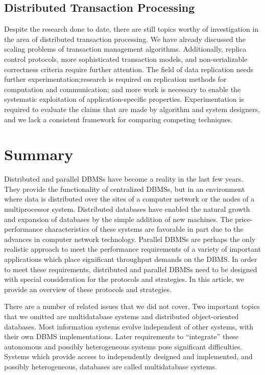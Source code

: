 \documentclass{article}
\begin{document}
\subsection{Distributed Transaction Processing}
Despite the research done to date, there are still topics worthy of investigation in the area of distributed
transaction processing. We have already discussed the scaling problems of transaction management algorithms. Additionally, replica control protocols, more sophisticated transaction models, and non-serializable correctness criteria require further attention. The field of data replication needs further experimentation;research is required on replication methods for computation and communication; and more work is necessary to enable the systematic exploitation of application-specific properties. Experimentation is required to evaluate the claims that are made by algorithm and system designers, and we lack a consistent framework for comparing competing techniques.

\section{Summary}
Distributed and parallel DBMSs have become a reality in the last few years. They provide the functionality of centralized DBMSs, but in an environment where data is distributed over the sites of a computer network or the nodes of a multiprocessor system. Distributed databases have enabled the natural growth and expansion of databases by the simple addition of new machines. The price-performance characteristics of these systems are favorable in part due to the advances in computer network technology. Parallel DBMSs are perhaps the only realistic approach to meet the performance requirements of a variety of important applications which place significant throughput demands on the DBMS. In order to meet these requirements, distributed and
parallel DBMSs need to be designed with special consideration for the protocols and strategies. In this article, we provide an overview of these protocols and strategies.

There are a number of related issues that we did not cover. Two important topics that we omitted are multidatabase systems and distributed object-oriented databases. Most information systems evolve independent of other systems, with their own DBMS implementations. Later requirements to “integrate”
these autonomous and possibly heterogeneous systems pose significant difficulties. Systems which provide
access to independently designed and implemented, and possibly heterogeneous, databases are called
multidatabase systems.
\end{document}

